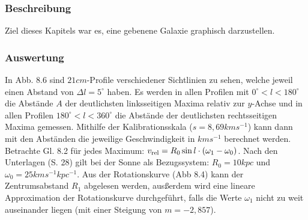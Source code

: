 \documentclass[12pt]{article}
\begin{document}
\subsubsection*{Beschreibung}
Ziel dieses Kapitels war es, eine gebenene Galaxie graphisch darzustellen.
\subsubsection*{Auswertung}
In Abb. 8.6 sind $21cm$-Profile verschiedener Sichtlinien zu sehen, welche jeweil einen Abstand von $\Delta l = 5^\circ$ haben. Es werden in allen Profilen mit $0^\circ < l < 180^\circ$ die Abstände $A$ der deutlichsten linksseitigen Maxima relativ zur $y$-Achse und in allen Profilen $180^\circ < l < 360^\circ$  die Abstände der deutlichsten rechtsseitigen Maxima gemessen. Mithilfe der Kalibrationsskala ($s= 8,69 kms^{-1}$) kann dann mit den Abständen die jeweilige Geschwindigkeit in $kms^{-1}$ berechnet werden.
Betrachte Gl. 8.2 für jedes Maximum: $v_{\textnormal{rel}} = R_0  \sin l \cdot (\omega_1- \omega_0)$. Nach den Unterlagen (S. 28) gilt bei der Sonne als Bezugssystem: $R_0 = 10 kpc$ und $\omega_0 = 25 kms^{-1}kpc^{-1}$. Aus der Rotationskurve (Abb 8.4) kann der Zentrumsabstand $R_1$ abgelesen werden, ausßerdem wird eine lineare Approximation der Rotationskurve durchgeführt, falls die Werte $\omega_1$ nicht zu weit auseinander liegen (mit einer Steigung von $m=-2,857$).
\newpage\noindent
\end{document}

